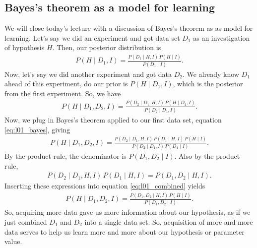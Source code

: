 \subsection{Bayes's theorem as a model for learning}
\label{sec:l01_learning}
We will close today's lecture with a discussion of Bayes's theorem as
as model for learning.  Let's say we did an experiment and got data
set $D_1$ as an investigation of hypothesis $H$.  Then, our posterior
distribution is
\begin{align}
P(H\mid D_1, I) = \frac{P(D_1 \mid H, I)\, P(H \mid I)}{P(D_1 \mid I)}.
\label{eq:l01_bayes}
\end{align}
Now, let's say we did another experiment and got data $D_2$.  We
already know $D_1$ ahead of this experiment, do our prior is
$P(H\mid D_1, I)$, which is the posterior from the first experiment.
So, we have
\begin{align}
  P(H\mid D_1, D_2, I) = \frac{P(D_2 \mid D_1, H, I)\, P(H \mid D_1, I)}{P(D_2 \mid D_1, I)}.
\end{align}
Now, we plug in Bayes's theorem applied to our first data set,
equation \eqref{eq:l01_bayes}, giving
\begin{align}
P(H\mid D_1, D_2, I) = \frac{P(D_2 \mid D_1, H, I)\,P(D_1 \mid H, I)\, P(H \mid I)}{P(D_2 \mid D_1, I)\, P(D_1 \mid I)}.
\label{eq:l01_combined}
\end{align}
By the product rule, the denominator is $P(D_1, D_2 \mid I)$.  Also by
the product rule,
\begin{align}
P(D_2 \mid D_1, H, I)\,P(D_1 \mid H, I) = P(D_1, D_2 \mid H, I).
\end{align}
Inserting these expressions into equation \eqref{eq:l01_combined}
yields
\begin{align}
  P(H\mid D_1, D_2, I) = \frac{P(D_1, D_2 \mid H, I)\,P(H\mid I)}{P(D_1, D_2 \mid I)}.
\end{align}
So, acquiring more data gave us more information about our hypothesis,
as if we just combined $D_1$ and $D_2$ into a single data set. So, acquisition of more and more data serves to help us learn more and more about our hypothesis or parameter value.
